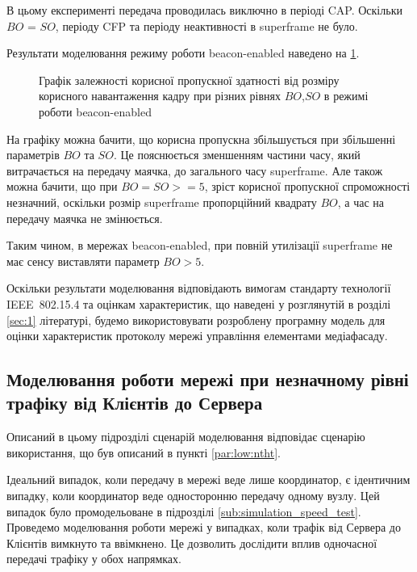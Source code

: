 \documentclass[a4paper,ukrainian,utf8,nocolumnsxix,nocolumnxxxii,nocolumnxxxi,floatsection,equationsection]{eskdtext}
\newcommand{\longcaption}[1]{\captionsetup{style=figureLongCaption}\caption{#1}}
\newcommand{\iee}[0]{IEEE~802.15.4\xspace}
\newcommand{\bem}[0]{beacon-enabled\xspace}
\begin{document}
В цьому експерименті передача проводилась виключно в періоді CAP. Оскільки $BO$ = $SO$, періоду CFP та періоду неактивності в superframe не було.

Результати моделювання режиму роботи \bem наведено на \cref{fig:result_tp_beacon}.

\begin{figure}[htbp]
	\centering
	\longcaption{\label{fig:result_tp_beacon}Графік залежності корисної пропускної здатності від розміру корисного навантаження кадру при різних рівнях $BO$,$SO$ в режимі роботи \bem}
\end{figure}

На графіку можна бачити, що корисна пропускна збільшується при збільшенні параметрів $BO$ та $SO$. Це пояснюється зменшенням частини часу, який витрачається на передачу маячка, до загального часу superframe. Але також можна бачити, що при $BO=SO>=5$, зріст корисної пропускної спроможності незначний, оскільки розмір superframe пропорційний квадрату $BO$, а час на передачу маячка не змінюється.

Таким чином, в мережах \bem, при повній утилізації superframe не має сенсу виставляти параметр $BO>5$. 

Оскільки результати моделювання відповідають вимогам стандарту технології \iee та оцінкам характеристик, що наведені у розглянутій в розділі \ref{sec:1} літературі, будемо використовувати розроблену програмну модель для оцінки характеристик протоколу мережі управління елементами медіафасаду.

\subsection{Моделювання роботи мережі при незначному рівні трафіку від Клієнтів до Сервера}
\label{sub:simulation_backtraf_nobeac}

Описаний в цьому підрозділі сценарій моделювання відповідає сценарію використання, що був описаний в пункті \ref{par:low:ntht}.

Ідеальний випадок, коли передачу в мережі веде лише координатор, є ідентичним випадку, коли координатор веде односторонню передачу одному вузлу. Цей випадок було промодельоване в підрозділі \ref{sub:simulation_speed_test}. Проведемо моделювання роботи мережі у випадках, коли трафік від Сервера до Клієнтів вимкнуто та ввімкнено. Це дозволить дослідити вплив одночасної передачі трафіку у обох напрямках.
\end{document}
